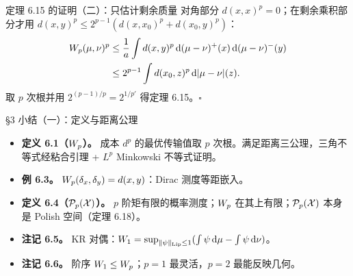 \begin{frame}{定理 6.15 的证明（二）：只估计剩余质量}
   对角部分 $d(x,x)^{p}=0$；在剩余乘积部分才用 $d(x,y)^{p}\le2^{p-1}(d(x,x_{0})^{p}+d(x_{0},y)^{p})$：
  \[
    \begin{aligned}
      W_{p}(\mu,\nu)^{p}
      &\le \frac{1}{a}\int d(x,y)^{p}\,\mathrm{d}(\mu-\nu)^{+}(x)\,\mathrm{d}(\mu-\nu)^{-}(y)\\
      &\le 2^{p-1}\int d(x_{0},z)^{p}\,\mathrm{d}|\mu-\nu|(z).
    \end{aligned}
  \]
  取 $p$ 次根并用 $2^{(p-1)/p}=2^{1/p'}$ 得定理 6.15。\proofskipnote\hfill$\square$

\end{frame}

\begin{frame}{§3 小结（一）：定义与距离公理}
  \begin{itemize}\small
    \item \textbf{定义 6.1（$W_{p}$）。} 成本 $d^{p}$ 的最优传输值取 $p$ 次根。满足距离三公理，三角不等式经粘合引理 + $L^{p}$ Minkowski 不等式证明。
    \item \textbf{例 6.3。} $W_{p}(\delta_{x},\delta_{y})=d(x,y)$：Dirac 测度等距嵌入。
    \item \textbf{定义 6.4（$\mathcal{P}_{p}(\mathcal{X})$）。} $p$ 阶矩有限的概率测度；$W_{p}$ 在其上有限；$\mathcal{P}_{p}(\mathcal{X})$ 本身是 Polish 空间（定理 6.18）。
    \item \textbf{注记 6.5。} KR 对偶：$W_{1}=\sup_{\|\psi\|_\mathrm{Lip}\le1}(\int\psi\,\mathrm{d}\mu-\int\psi\,\mathrm{d}\nu)$。
    \item \textbf{注记 6.6。} 阶序 $W_{1}\le W_{p}$；$p=1$ 最灵活，$p=2$ 最能反映几何。
  \end{itemize}

\end{frame}

